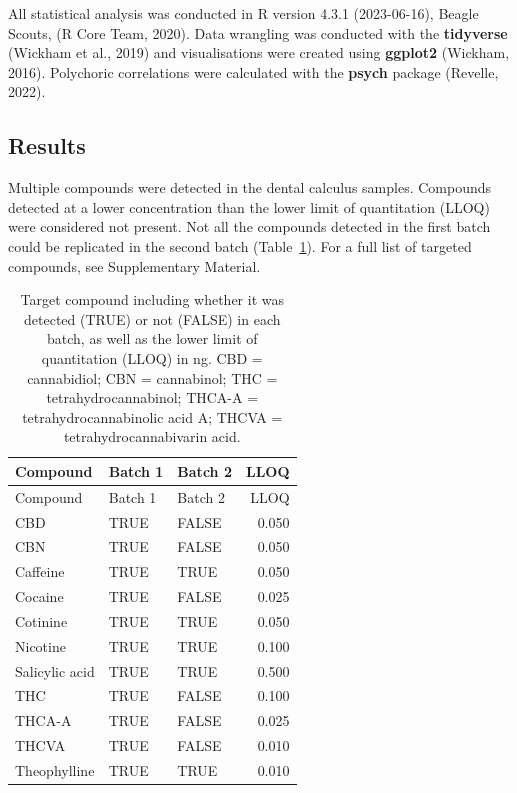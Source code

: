 \documentclass[
]{article}
\begin{document}
All statistical analysis was conducted in R version 4.3.1 (2023-06-16),
Beagle Scouts, (R Core Team, 2020). Data wrangling was conducted with
the \textbf{tidyverse} (Wickham et al., 2019) and visualisations were
created using \textbf{ggplot2} (Wickham, 2016). Polychoric correlations
were calculated with the \textbf{psych} package (Revelle, 2022).

\hypertarget{results}{%
\subsection{Results}\label{results}}

Multiple compounds were detected in the dental calculus samples.
Compounds detected at a lower concentration than the lower limit of
quantitation (LLOQ) were considered not present. Not all the compounds
detected in the first batch could be replicated in the second batch
(Table~\ref{tbl-compound-detect}). For a full list of targeted
compounds, see Supplementary Material.

\hypertarget{tbl-compound-detect}{}
\begin{longtable}[]{@{}lllr@{}}
\caption{\label{tbl-compound-detect}Target compound including whether it
was detected (TRUE) or not (FALSE) in each batch, as well as the lower
limit of quantitation (LLOQ) in ng. CBD = cannabidiol; CBN = cannabinol;
THC = tetrahydrocannabinol; THCA-A = tetrahydrocannabinolic acid A;
THCVA = tetrahydrocannabivarin acid.}\tabularnewline
\toprule\noalign{}
Compound & Batch 1 & Batch 2 & LLOQ \\
\midrule\noalign{}
\endfirsthead
\toprule\noalign{}
Compound & Batch 1 & Batch 2 & LLOQ \\
\midrule\noalign{}
\endhead
\bottomrule\noalign{}
\endlastfoot
CBD & TRUE & FALSE & 0.050 \\
CBN & TRUE & FALSE & 0.050 \\
Caffeine & TRUE & TRUE & 0.050 \\
Cocaine & TRUE & FALSE & 0.025 \\
Cotinine & TRUE & TRUE & 0.050 \\
Nicotine & TRUE & TRUE & 0.100 \\
Salicylic acid & TRUE & TRUE & 0.500 \\
THC & TRUE & FALSE & 0.100 \\
THCA-A & TRUE & FALSE & 0.025 \\
THCVA & TRUE & FALSE & 0.010 \\
Theophylline & TRUE & TRUE & 0.010 \\
\end{longtable}
\end{document}
